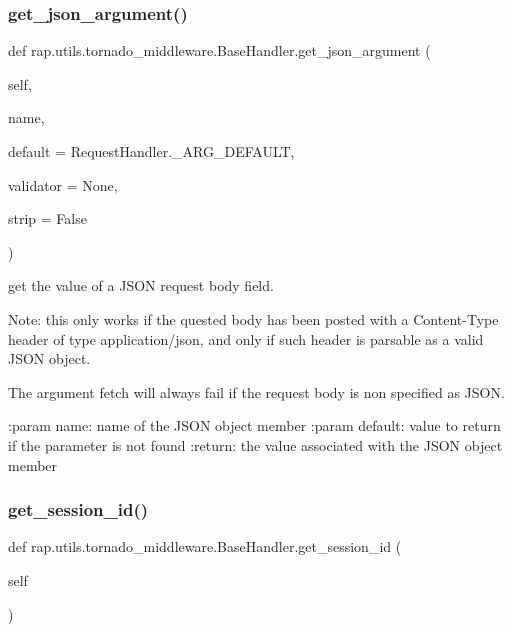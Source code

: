\subsubsection{\texorpdfstring{get\+\_\+json\+\_\+argument()}{get\_json\_argument()}}
{\footnotesize\ttfamily def rap.\+utils.\+tornado\+\_\+middleware.\+Base\+Handler.\+get\+\_\+json\+\_\+argument (\begin{DoxyParamCaption}\item[{}]{self,  }\item[{}]{name,  }\item[{}]{default = {\ttfamily RequestHandler.\+\_\+ARG\+\_\+DEFAULT},  }\item[{}]{validator = {\ttfamily None},  }\item[{}]{strip = {\ttfamily False} }\end{DoxyParamCaption})}

\begin{DoxyVerb}get the value of a JSON request body field.

Note: this only works if the quested body has been posted with a Content-Type header of type
application/json, and only if such header is parsable as a valid JSON object.

The argument fetch will always fail if the request body is non specified as JSON.

:param name: name of the JSON object member
:param default: value to return if the parameter is not found
:return: the value associated with the JSON object member
\end{DoxyVerb}
 \mbox{\label{classrap_1_1utils_1_1tornado__middleware_1_1BaseHandler_a03bc92f627012cebf7c9dacbeb958e14}} 
\subsubsection{\texorpdfstring{get\+\_\+session\+\_\+id()}{get\_session\_id()}}
{\footnotesize\ttfamily def rap.\+utils.\+tornado\+\_\+middleware.\+Base\+Handler.\+get\+\_\+session\+\_\+id (\begin{DoxyParamCaption}\item[{}]{self }\end{DoxyParamCaption})}

